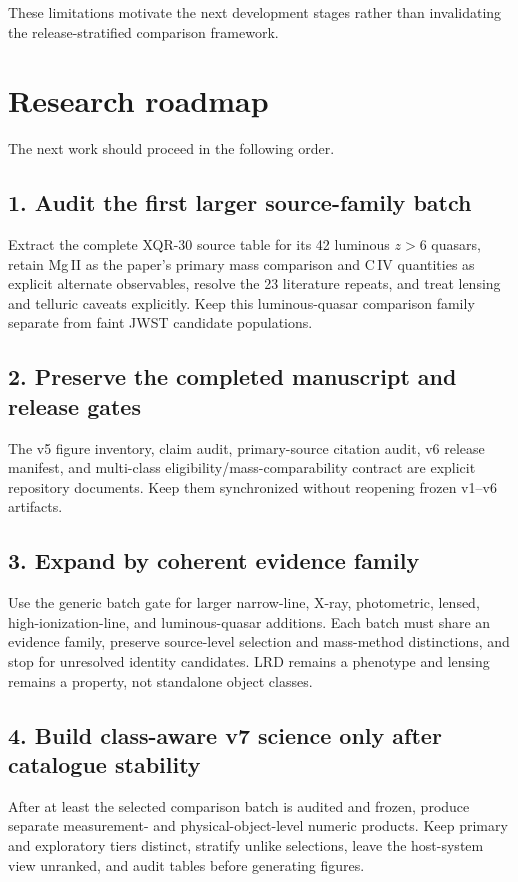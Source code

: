 \documentclass[11pt]{article}
\begin{document}
These limitations motivate the next development stages rather than invalidating the release-stratified comparison framework.

\section{Research roadmap}

The next work should proceed in the following order.

\subsection*{1. Audit the first larger source-family batch}
Extract the complete XQR-30 source table for its 42 luminous $z>6$ quasars, retain Mg\,II as the paper's primary mass comparison and C\,IV quantities as explicit alternate observables, resolve the 23 literature repeats, and treat lensing and telluric caveats explicitly. Keep this luminous-quasar comparison family separate from faint JWST candidate populations.

\subsection*{2. Preserve the completed manuscript and release gates}
The v5 figure inventory, claim audit, primary-source citation audit, v6 release manifest, and multi-class eligibility/mass-comparability contract are explicit repository documents. Keep them synchronized without reopening frozen v1--v6 artifacts.

\subsection*{3. Expand by coherent evidence family}
Use the generic batch gate for larger narrow-line, X-ray, photometric, lensed, high-ionization-line, and luminous-quasar additions. Each batch must share an evidence family, preserve source-level selection and mass-method distinctions, and stop for unresolved identity candidates. LRD remains a phenotype and lensing remains a property, not standalone object classes.

\subsection*{4. Build class-aware v7 science only after catalogue stability}
After at least the selected comparison batch is audited and frozen, produce separate measurement- and physical-object-level numeric products. Keep primary and exploratory tiers distinct, stratify unlike selections, leave the host-system view unranked, and audit tables before generating figures.
\end{document}

